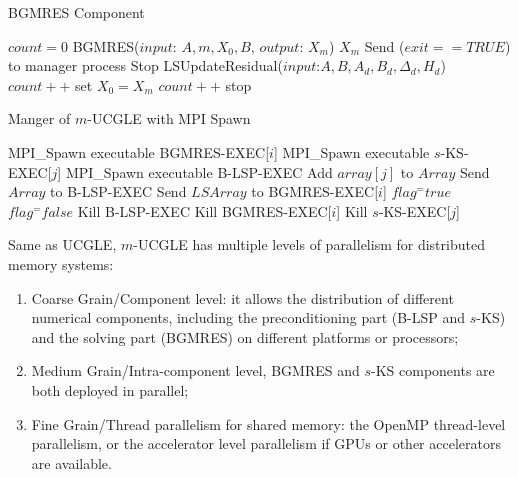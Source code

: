 \begin{algorithm}[h]
	\label{bgmresc}
	\caption{BGMRES Component}   
	\begin{algorithmic}[1]
		\State $count=0$
		\State BGMRES{($input$: $A, m, X_0,B$, $output$: $X_m$)}
		\State \Return $X_m$
		\State Send ($exit==TRUE$) to manager process
		\State Stop
		\Else {}
		\State LSUpdateResidual($input$:$A, B, A_d, B_d, \Delta_d, H_d$)
		\State $count++$
		\EndIf
		\Else
		\State set $X_0=X_m$
		\State $count++$
		\EndIf
		\EndIf
		\State stop \EndIf
		\EndFunction
	\end{algorithmic}  
\end{algorithm}

\begin{algorithm}[htbp]
	\caption{Manger of $m$-UCGLE with MPI Spawn}   
	\label{alg:ucmgle}   
	\begin{algorithmic}[1]
		\State MPI\_Spawn executable BGMRES-EXEC[$i$]
		\EndFor
		\State MPI\_Spawn executable $s$-KS-EXEC[$j$]
		\EndFor
		\State MPI\_Spawn executable B-LSP-EXEC
		\State Add $array[j]$ to $Array$
		\EndIf
		\EndFor
		\State Send $Array$ to B-LSP-EXEC
		\EndIf
		\State Send $LSArray$ to BGMRES-EXEC[$i$]
		\EndFor
		\EndIf
		\State $flag ^= true$
		\Else
		\State $flag ^= false$
		\EndIf
		\EndIf
		\EndFor
		\State Kill B-LSP-EXEC
		\State Kill BGMRES-EXEC[$i$]
		\EndFor
		\State Kill $s$-KS-EXEC[$j$]
		\EndFor
		\EndIf
		\EndFunction
		
	\end{algorithmic}  
\end{algorithm}


Same as UCGLE, $m$-UCGLE has multiple levels of parallelism for distributed memory systems:

\begin{enumerate}
	\item Coarse Grain/Component level: it allows the distribution of different numerical components, including the preconditioning part (B-LSP and $s$-KS) and the solving part (BGMRES) on different platforms or processors;
	\item Medium Grain/Intra-component level, BGMRES and $s$-KS components are both deployed in parallel;
	\item Fine Grain/Thread parallelism for shared memory: the OpenMP thread-level parallelism, or the accelerator level parallelism if GPUs or other accelerators are available.
\end{enumerate} 

